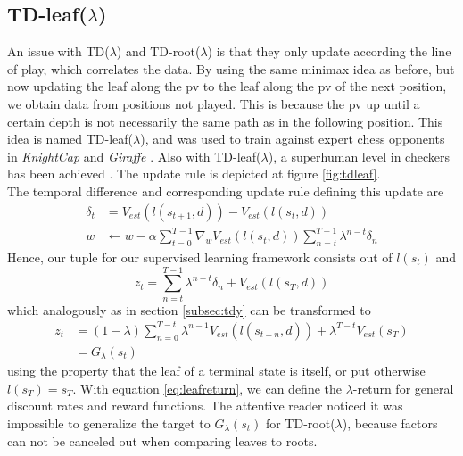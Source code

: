 \subsection{TD-leaf($\lambda$)}
\label{subsec:tdleaf}
An issue with TD($\lambda$) and TD-root($\lambda$) is that they only update according the line of play, which correlates the data. By using the same minimax idea as before, but now updating the leaf along the \gls{pv} to the leaf along the \gls{pv} of the next position, we obtain data from positions not played. This is because the \gls{pv} up until a certain depth is not necessarily the same path as in the following position. This idea is named TD-leaf($\lambda$), and was used to train against expert chess opponents in \textit{KnightCap} and \textit{Giraffe} \cite{baxt99,giraffe15}. Also with TD-leaf($\lambda$), a superhuman level in checkers has been achieved \cite{chinook}. The update rule is depicted at figure \ref{fig:tdleaf}. \\
The temporal difference and corresponding update rule defining this update are
\begin{align}
\delta_t&=V_{est}\left(l(s_{t+1},d)\right)-V_{est}(l(s_{t},d))\\
w &\leftarrow w-\alpha \sum_{t=0}^{T-1} \nabla_w V_{est}(l(s_t,d)) \sum_{n=t}^{T-1} \lambda^{n-t}\delta_n
\end{align}
Hence, our tuple for our supervised learning framework consists out of $l(s_t)$ and
\begin{equation}
z_t=\sum_{n=t}^{T-1} \lambda^{n-t} \delta_n+V_{est}(l(s_T,d))
\end{equation}
which analogously as in section \ref{subsec:tdy} can be transformed to
\begin{align}
z_t&=(1-\lambda)\sum_{n=0}^{T-t}\lambda^{n-1}V_{est}(l(s_{t+n},d)) + \lambda^{T-t}V_{est}(s_T)\\
&=G_\lambda(s_t)
\label{eq:leafreturn}
\end{align}
using the property that the leaf of a terminal state is itself, or put otherwise $l(s_T)=s_T$. With equation \ref{eq:leafreturn}, we can define the $\lambda$-return for general discount rates and reward functions.
The attentive reader noticed it was impossible to generalize the target to $G_\lambda(s_t)$ for TD-root($\lambda$), because factors can not be canceled out when comparing leaves to roots.

